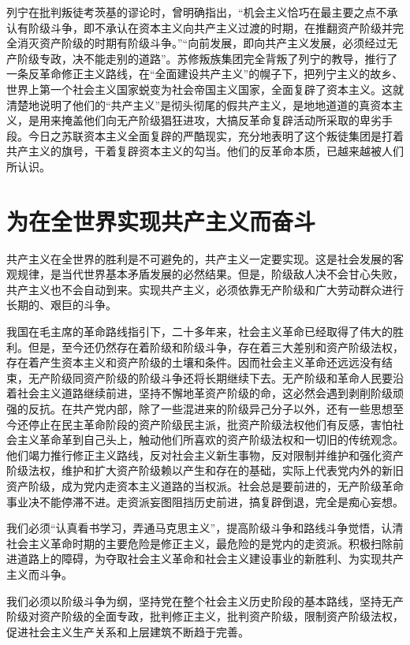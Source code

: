 \documentclass{book}
\begin{document}
列宁在批判叛徒考茨基的谬论时，曾明确指出，“机会主义恰巧在最主要之点不承认有阶级斗争，即不承认在资本主义向共产主义过渡的时期，在推翻资产阶级并完全消灭资产阶级的时期有阶级斗争。”“向前发展，即向共产主义发展，必须经过无产阶级专政，决不能走别的道路”。苏修叛族集团完全背叛了列宁的教导，推行了一条反革命修正主义路线，在“全面建设共产主义”的幌子下，把列宁主义的故乡、世界上第一个社会主义国家蜕变为社会帝国主义国家，全面复辟了资本主义。这就清楚地说明了他们的“共产主义”是彻头彻尾的假共产主义，是地地道道的真资本主义，是用来掩盖他们向无产阶级猖狂进攻，大搞反革命复辟活动所采取的卑劣手段。今日之苏联资本主义全面复辟的严酷现实，充分地表明了这个叛徒集团是打着共产主义的旗号，干着复辟资本主义的勾当。他们的反革命本质，已越来越被人们所认识。


\section{为在全世界实现共产主义而奋斗}

共产主义在全世界的胜利是不可避免的，共产主义一定要实现。这是社会发展的客观规律，是当代世界基本矛盾发展的必然结果。但是，阶级敌人决不会甘心失败，共产主义也不会自动到来。实现共产主义，必须依靠无产阶级和广大劳动群众进行长期的、艰巨的斗争。

我国在毛主席的革命路线指引下，二十多年来，社会主义革命已经取得了伟大的胜利。但是，至今还仍然存在着阶级和阶级斗争，存在着三大差别和资产阶级法权，存在着产生资本主义和资产阶级的土壤和条件。因而社会主义革命还远远没有结束，无产阶级同资产阶级的阶级斗争还将长期继续下去。无产阶级和革命人民要沿着社会主义道路继续前进，坚持不懈地革资产阶级的命，这必然会遇到剥削阶级顽强的反抗。在共产党内部，除了一些混进来的阶级异己分子以外，还有一些思想至今还停止在民主革命阶段的资产阶级民主派，批资产阶级法权他们有反感，害怕社会主义革命革到自己头上，触动他们所喜欢的资产阶级法权和一切旧的传统观念。他们竭力推行修正主义路线，反对社会主义新生事物，反对限制并维护和强化资产阶级法权，维护和扩大资产阶级赖以产生和存在的基础，实际上代表党内外的新旧资产阶级，成为党内走资本主义道路的当权派。社会总是要前进的，无产阶级革命事业决不能停滞不进。走资派妄图阻挡历史前进，搞复辟倒退，完全是痴心妄想。

我们必须“认真看书学习，弄通马克思主义”，提高阶级斗争和路线斗争觉悟，认清社会主义革命时期的主要危险是修正主义，最危险的是党内的走资派。积极扫除前进道路上的障碍，为夺取社会主义革命和社会主义建设事业的新胜利、为实现共产主义而斗争。

我们必须以阶级斗争为纲，坚持党在整个社会主义历史阶段的基本路线，坚持无产阶级对资产阶级的全面专政，批判修正主义，批判资产阶级，限制资产阶级法权，促进社会主义生产关系和上层建筑不断趋于完善。
\end{document}
